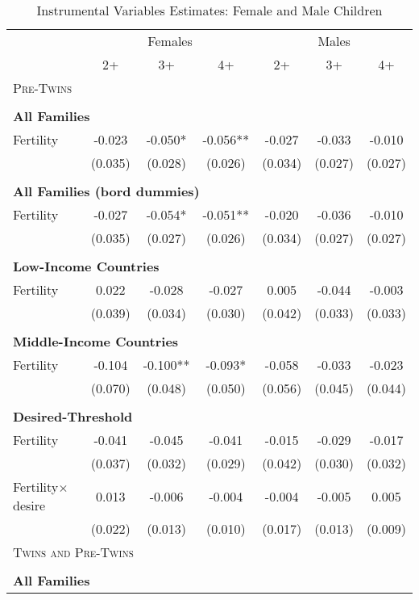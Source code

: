 \begin{table}[!htbp] \centering 
\caption{Instrumental Variables Estimates: Female and Male Children} 
\vspace{4mm}\label{TWINtab:IVgend} 
\begin{tabular}{lcccccc} \toprule \toprule 
&\multicolumn{3}{c}{Females}&\multicolumn{3}{c}{Males}\\ 
\cmidrule(r){2-4} \cmidrule(r){5-7} 
&2+&3+&4+&2+&3+&4+ \\ \midrule 
\multicolumn{7}{l}{\textsc{Pre-Twins}}\\ 
&&&&\\
\multicolumn{7}{l}{\textbf{All Families}}\\ 
Fertility&-0.023&-0.050*&-0.056**&-0.027&-0.033&-0.010\\
&(0.035)&(0.028)&(0.026)&(0.034)&(0.027)&(0.027)\\
&&&&\\
\multicolumn{7}{l}{\textbf{All Families (bord dummies)}}\\ 
Fertility&-0.027&-0.054*&-0.051**&-0.020&-0.036&-0.010\\
&(0.035)&(0.027)&(0.026)&(0.034)&(0.027)&(0.027)\\
&&&&\\
\multicolumn{7}{l}{\textbf{Low-Income Countries}}\\ 
Fertility&0.022&-0.028&-0.027&0.005&-0.044&-0.003\\
&(0.039)&(0.034)&(0.030)&(0.042)&(0.033)&(0.033)\\
&&&&\\
\multicolumn{7}{l}{\textbf{Middle-Income Countries}}\\ 
Fertility&-0.104&-0.100**&-0.093*&-0.058&-0.033&-0.023\\
&(0.070)&(0.048)&(0.050)&(0.056)&(0.045)&(0.044)\\
&&&&\\
\multicolumn{7}{l}{\textbf{Desired-Threshold}}\\ 
Fertility&-0.041&-0.045&-0.041&-0.015&-0.029&-0.017\\
&(0.037)&(0.032)&(0.029)&(0.042)&(0.030)&(0.032)\\
Fertility$\times$desire&0.013&-0.006&-0.004&-0.004&-0.005&0.005\\
&(0.022)&(0.013)&(0.010)&(0.017)&(0.013)&(0.009)\\
\midrule\multicolumn{5}{l}{\textsc{Twins and Pre-Twins}}\\ 
&&&&\\
\multicolumn{7}{l}{\textbf{All Families}}\\ 

\end{tabular}
\end{table}

